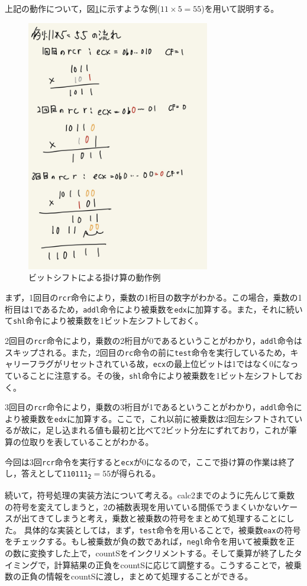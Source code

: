 \documentclass[a4paper]{jsarticle}
\newcommand{\var}[1]{\texttt{#1}}
\begin{document}
上記の動作について，図\ref{fig:mul_example}に示すような例($11 \times 5 = 55$)を用いて説明する。


\begin{figure}[h]
    \centering
    \includegraphics[width=8cm]{./img-mul.jpg}
    \caption{ビットシフトによる掛け算の動作例}
    \label{fig:mul_example}
\end{figure}


まず，1回目の\var{rcr}命令により，乗数の1桁目の数字がわかる。この場合，乗数の1桁目は1であるため，\var{addl}命令により被乗数を\var{edx}に加算する。また，それに続いて\var{shl}命令により被乗数を1ビット左シフトしておく。

2回目の\var{rcr}命令により，乗数の2桁目が0であるということがわかり，\var{addl}命令はスキップされる。また，2回目の\var{rc}命令の前に\var{test}命令を実行しているため，キャリーフラグがリセットされている故，\var{ecx}の最上位ビットは1ではなく0になっていることに注意する。その後，\var{shl}命令により被乗数を1ビット左シフトしておく。

3回目の\var{rcr}命令により，乗数の3桁目が1であるということがわかり，\var{addl}命令により被乗数を\var{edx}に加算する。ここで，これ以前に被乗数は2回左シフトされているが故に，足し込まれる値も最初と比べて2ビット分左にずれており，これが筆算の位取りを表していることがわかる。

今回は3回\var{rcr}命令を実行すると\var{ecx}が0になるので，ここで掛け算の作業は終了し，答えとして\texttt{110111\textsubscript{2}}$=55$が得られる。

続いて，符号処理の実装方法について考える。calc2までのように先んじて乗数の符号を変えてしまうと，2の補数表現を用いている間係でうまくいかないケースが出てきてしまうと考え，乗数と被乗数の符号をまとめて処理することにした。
具体的な実装としては，まず，\var{test}命令を用いることで，被乗数\var{eax}の符号をチェックする。もし被乗数が負の数であれば，\var{negl}命令を用いて被乗数を正の数に変換すした上で，countSをインクリメントする。そして乗算が終了したタイミングで，計算結果の正負をcountSに応じて調整する。こうすることで，被乗数の正負の情報をcountSに渡し，まとめて処理することができる。
\end{document}
